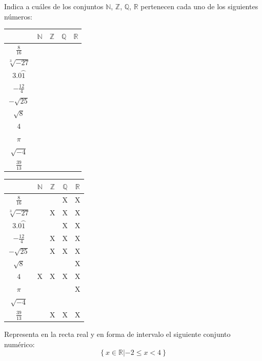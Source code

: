 \documentclass[addpoints,spanish, 12pt,a4paper]{exam}
\begin{document}
\begin{questions}

\question[2] Indica a cuáles de los conjuntos
$\mathbb{N}$, $\mathbb{Z}$, $\mathbb{Q}$, $\mathbb{R}$ pertenecen cada uno de los siguientes números:
\begin{center}
\begin{tabular}{|c |c |c |c |c|}\hline
&$\mathbb{N}$& $\mathbb{Z}$& $\mathbb{Q}$&$\mathbb{R}$\\ 
\hline
$\frac{8}{16}$&&&&\\
\hline
$\sqrt[3]{-27}$&&&&\\
\hline
$3.0\wideparen{1}$&&&&\\
\hline
$-\frac{12}{4}$&&&&\\
\hline
$-\sqrt{25}$&&&&\\
\hline
$\sqrt{8}$&&&&\\
\hline
$4$&&&&\\
\hline
$\pi$&&&&\\
\hline
$\sqrt{-4}$&&&&\\
\hline
$\frac{39}{13}$&&&&\\
\hline
\end{tabular}

\end{center}

\begin{solution}
\begin{tabular}{|c |c |c |c |c|}\hline
&$\mathbb{N}$& $\mathbb{Z}$& $\mathbb{Q}$&$\mathbb{R}$\\ 
\hline
$\frac{8}{16}$&&&X&X\\
\hline
$\sqrt[3]{-27}$&&X&X&X\\
\hline
$3.0\wideparen{1}$&&&X&X\\
\hline
$-\frac{12}{4}$&&X&X&X\\
\hline
$-\sqrt{25}$&&X&X&X\\
\hline
$\sqrt{8}$&&&&X\\
\hline
$4$&X&X&X&X\\
\hline
$\pi$&&&&X\\
\hline
$\sqrt{-4}$&&&&\\
\hline
$\frac{39}{13}$&&X&X&X\\
\hline
\end{tabular}
\end{solution}
\addpoints

\question[1] Representa en la recta real y en forma de intervalo el siguiente conjunto numérico:
\addpoints %
$$\left\{ x \in \mathbb{R} \left| -2 \leqslant x < 4 \right. \right\}$$


\end{questions}
\end{document}
